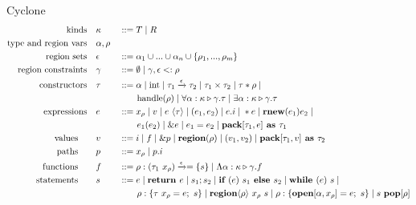 \documentclass[aspectratio=169]{beamer}
\begin{document}
\begin{frame}{Cyclone}
\scriptsize{
\begin{alignat*}{2}
\text{kinds}\quad &\kappa &&::= T \altm R
\\
\text{type and region vars}\quad &\alpha,\rho &&
\\
\text{region sets}\quad &\epsilon &&::= \alpha_1 \cup ... \cup \alpha_n \cup \{\rho_1,...,\rho_m\}
\\
\text{region constraints} \quad &\gamma &&::= \emptyset \altm \gamma, \epsilon <: \rho
\\
\text{constructors} \quad &\tau &&::= \alpha \altm \text{int} \altm \tau_1 \xrightarrow[]{\epsilon} \tau_2 \altm \tau_1 \times \tau_2 \altm \tau \ast \rho \altm
\\
~ & ~ && \qquad \text{handle}(\rho) \altm \forall\alpha:\kappa \triangleright \gamma.\tau \altm \exists \alpha:\kappa \triangleright \gamma.\tau
\\
\text{expressions} \quad &e &&::= x_\rho \altm v \altm e\ \langle\tau\rangle \altm (e_1,e_2) \altm e.i \altm \ast e \altm \textbf{rnew}(e_1)e_2 \altm
\\
~ & ~ && \qquad e_1(e_2) \altm \&e \altm e_1 = e_2 \altm \textbf{pack} [\tau_1, e]\textbf{ as } \tau_1
\\
\text{values} \qquad &v &&::= i \altm f \altm \&p \altm \textbf{region}(\rho) \altm (v_1, v_2) \altm \textbf{pack}[\tau_1,v]\textbf{ as } \tau_2
\\
\text{paths} \qquad &p &&::= x_\rho \altm p.i
\\
\text{functions} \qquad &f &&::= \rho:(\tau_1\ x_{\rho}) \xrightarrow[]{\epsilon} = \{s\} \altm \Lambda\alpha:\kappa \triangleright \gamma.f
\\
\text{statements} \qquad &s &&::= e \altm \textbf{return } e \altm s_1;s_2 \altm \textbf{if } (e)\ s_1 \textbf{ else } s_2 \altm \textbf{while } (e)\ s \altm
\\
~ & ~ && \qquad \rho:\{\tau\ x_\rho = e;\ s\} \altm \textbf{region}\langle\rho\rangle\ x_{\rho}\ s \altm \rho:\{\textbf{open}[\alpha,x_{\rho}] = e;\ s\} \altm s\ \textbf{pop}[\rho]
\end{alignat*}
    }
\end{frame}
\end{document}
